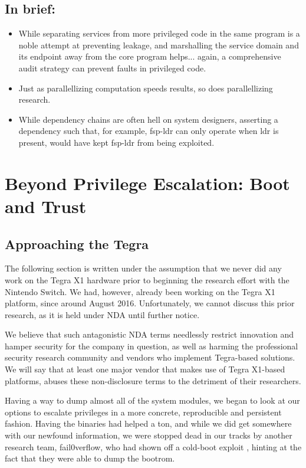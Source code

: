 \documentclass[journal]{IEEEtran}
\begin{document}
\subsection*{In brief:}
\begin{itemize}
\item While separating services from more privileged code in the same program is a noble attempt
at preventing leakage, and marshalling the service domain and its endpoint away from the core
program helps... again, a comprehensive audit strategy can prevent faults in privileged code.
\item Just as parallellizing computation speeds results, so does parallellizing research.
\item While dependency chains are often hell on system designers, asserting a dependency such that,
for example, fsp-ldr can only operate when ldr is present, would have kept fsp-ldr from being
exploited. 
\end{itemize}


\section{Beyond Privilege Escalation: Boot and Trust}

\subsection{Approaching the Tegra}

The following section is written under the assumption that we never did any work on the Tegra X1
hardware prior to beginning the research effort with the Nintendo Switch. We had, however, already
been working on the Tegra X1 platform, since around August 2016.
Unfortunately, we cannot discuss this prior research, as it is held under NDA until further notice.

We believe that such antagonistic NDA terms needlessly restrict innovation and hamper
security for the company in question, as well as harming the professional security research
community and vendors who implement Tegra-based solutions. We will say that at least one major
vendor that makes use of Tegra X1-based platforms, abuses these non-disclosure terms to the
detriment of their researchers.

Having a way to dump almost all of the system modules, we began to look at our options to
escalate privileges in a more concrete, reproducible and persistent fashion. Having the binaries
had helped a ton, and while we did get somewhere with our newfound information, we were stopped
dead in our tracks by another research team, fail0verflow, who had shown off a cold-boot exploit
\cite{oh_come_on_it_was_getting_fun}, hinting at the fact that they were able to dump the bootrom.
\end{document}
